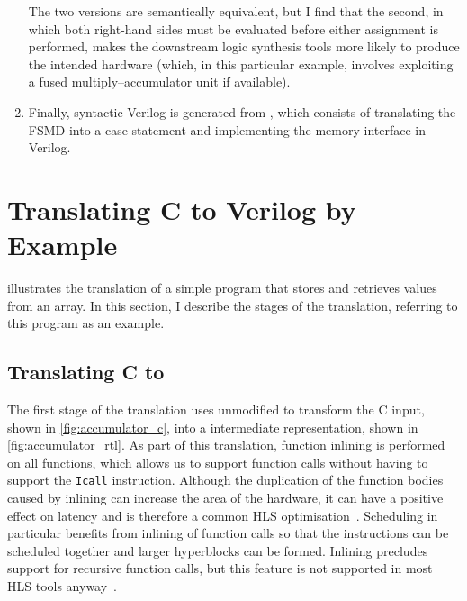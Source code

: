 \begin{enumerate}[label=\protect\blacknum{\arabic*}]
\begin{center}
\end{center}
%
The two versions are semantically equivalent, but I find that the second, in
which both right-hand sides must be evaluated before either assignment is
performed, makes the downstream logic synthesis tools more likely to produce the
intended hardware (which, in this particular example, involves exploiting a
fused multiply--accumulator unit if available).
\item Finally, syntactic Verilog is generated from \htl{}, which consists of
  translating the \gls{FSMD} into a case statement and implementing the memory
  interface in Verilog.
\end{enumerate}

\section{Translating C to Verilog by Example}%
\label{sec:itv:translating-c-to-verilog}

 illustrates the translation of a simple program
that stores and retrieves values from an array.  In this section, I describe the
stages of the \vericert{} translation, referring to this program as an example.

\subsection{Translating C to \rtl{}}

The first stage of the translation uses unmodified \compcert{} to transform the
C input, shown in \cref{fig:accumulator_c}, into a \rtl{} intermediate
representation, shown in \cref{fig:accumulator_rtl}.  As part of this
translation, function inlining is performed on all functions, which allows us to
support function calls without having to support the \texttt{Icall} \rtl{}
instruction.  Although the duplication of the function bodies caused by inlining
can increase the area of the hardware, it can have a positive effect on latency
and is therefore a common HLS optimisation~\cite{noronha17_rapid_fpga}.
Scheduling in particular benefits from inlining of function calls so that the
instructions can be scheduled together and larger hyperblocks can be formed.
Inlining precludes support for recursive function calls, but this feature is not
supported in most HLS tools anyway~\cite{thomas16_srcht}.

